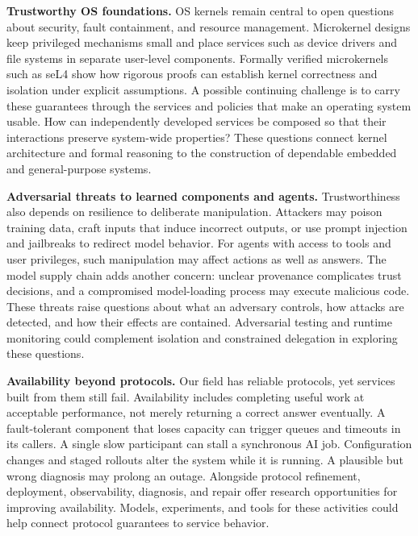 \documentclass[manuscript]{acmart}
\begin{document}
\textbf{Trustworthy OS foundations.}
OS kernels remain central to open questions about security, fault containment, and resource management.
Microkernel designs keep privileged mechanisms small and place services such as device drivers and file systems in separate user-level components.
Formally verified microkernels such as seL4 show how rigorous proofs can establish kernel correctness and isolation under explicit assumptions.
A possible continuing challenge is to carry these guarantees through the services and policies that make an operating system usable.
How can independently developed services be composed so that their interactions preserve system-wide properties?
These questions connect kernel architecture and formal reasoning to the construction of dependable embedded and general-purpose systems.

\textbf{Adversarial threats to learned components and agents.}
Trustworthiness also depends on resilience to deliberate manipulation.
Attackers may poison training data, craft inputs that induce incorrect outputs, or use prompt injection and jailbreaks to redirect model behavior.
For agents with access to tools and user privileges, such manipulation may affect actions as well as answers.
The model supply chain adds another concern: unclear provenance complicates trust decisions, and a compromised model-loading process may execute malicious code.
These threats raise questions about what an adversary controls, how attacks are detected, and how their effects are contained.
Adversarial testing and runtime monitoring could complement isolation and constrained delegation in exploring these questions.

\textbf{Availability beyond protocols.}
Our field has reliable protocols, yet services built from them still fail.
Availability includes completing useful work at acceptable performance, not merely returning a correct answer eventually.
A fault-tolerant component that loses capacity can trigger queues and timeouts in its callers.
A single slow participant can stall a synchronous AI job.
Configuration changes and staged rollouts alter the system while it is running.
A plausible but wrong diagnosis may prolong an outage.
Alongside protocol refinement, deployment, observability, diagnosis, and repair offer research opportunities for improving availability.
Models, experiments, and tools for these activities could help connect protocol guarantees to service behavior.
\end{document}
